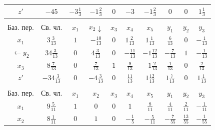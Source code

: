 \documentclass[a4paper,14pt]{extarticle}
\begin{document}
\begin{center}
\begin{tabular}{|c|c|c|c|c|c|c|c|c|c|}
        \hline
        $z'$             & $-45$             & $-3\frac{1}{3}$  & $-1\frac{2}{3}$  & $0$              & $-3$             & $-1\frac{2}{3}$   & $0$             & $0$             & $1\frac{1}{3}$  \\
        \hline
        \multicolumn{10}{c}{}                                                                                                                                                                      \\
        \hline
        Баз. пер.        & Св. чл.           & $x_1$            & $x_2 \downarrow$ & $x_3$            & $x_4 $           & $x_5$             & $y_1$           & $y_2$           & $y_3$           \\
        \hline
        $x_1$            & $3\frac{3}{13}$   & $1$              & $-\frac{10}{13}$ & $0$              & $1\frac{2}{13}$  & $1\frac{1}{13}$   & $\frac{6}{13}$  & $0$             & $-\frac{1}{13}$ \\
        \hline
        $\leftarrow y_2$ & $34\frac{3}{13}$  & $0$              & $4\frac{3}{13}$  & $0$              & $-\frac{11}{13}$ & $-1\frac{12}{13}$ & $-\frac{7}{13}$ & $1$             & $-\frac{1}{13}$ \\
        \hline
        $x_3$            & $8\frac{7}{13}$   & $0$              & $\frac{7}{13}$   & $1$              & $\frac{9}{13}$   & $-1\frac{2}{13}$  & $\frac{1}{13}$  & $0$             & $\frac{2}{13}$  \\
        \hline
        $z'$             & $-34\frac{3}{13}$ & $0$              & $-4\frac{3}{13}$ & $0$              & $\frac{11}{13}$  & $1\frac{12}{13}$  & $1\frac{7}{13}$ & $0$             & $1\frac{1}{13}$ \\
        \hline
        \multicolumn{10}{c}{}                                                                                                                                                                      \\
        \hline
        Баз. пер.        & Св. чл.           & $x_1$            & $x_2$            & $x_3$            & $x_4 $           & $x_5$             & $y_1$           & $y_2$           & $y_3$           \\
        \hline
        $x_1$            & $9\frac{5}{11}$   & $1$              & $0$              & $0$              & $1$              & $\frac{8}{11}$    & $\frac{4}{11}$  & $\frac{2}{11}$  & $-\frac{1}{11}$ \\
        \hline
        $x_2$            & $8\frac{1}{11}$   & $0$              & $1$              & $0$              & $-\frac{1}{5}$   & $-\frac{5}{11}$   & $-\frac{7}{55}$ & $\frac{13}{55}$ & $-\frac{1}{55}$ \\

\end{tabular}
\end{center}
\end{document}
